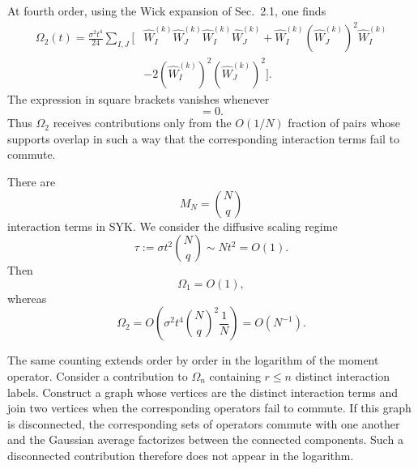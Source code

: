 \documentclass{article}
\theoremstyle{definition}
\begin{document}
At fourth order, using the Wick expansion of Sec.~2.1, one finds
\begin{align}
    \Omega_2(t)
    =
    \frac{\sigma^2t^4}{24}
    \sum_{I,J}
    \bigg[
       &
       \widehat W_I^{(k)}
       \widehat W_J^{(k)}
       \widehat W_I^{(k)}
       \widehat W_J^{(k)}
       +
       \widehat W_I^{(k)}
       \left(\widehat W_J^{(k)}\right)^2
       \widehat W_I^{(k)}
       \nonumber\\
       &
       -
       2
       \left(\widehat W_I^{(k)}\right)^2
       \left(\widehat W_J^{(k)}\right)^2
    \bigg].
    \label{eq:quenched_Omega2}
\end{align}
The expression in square brackets vanishes whenever
\begin{equation}
    [\widehat W_I^{(k)},\widehat W_J^{(k)}]=0.
\end{equation}
Thus $\Omega_2$ receives contributions only from the $O(1/N)$ fraction of
pairs whose supports overlap in such a way that the corresponding
interaction terms fail to commute.

There are
\begin{equation}
    M_N=\binom Nq
\end{equation}
interaction terms in SYK.  We consider the diffusive scaling regime
\begin{equation}
    \tau
    :=
    \sigma t^2\binom Nq
    \sim Nt^2
    =
    O(1).
    \label{eq:quenched_diffusive_tau}
\end{equation}
Then
\begin{equation}
    \Omega_1=O(1),
\end{equation}
whereas
\begin{equation}
    \Omega_2
    =
    O\left(
       \sigma^2t^4
       \binom Nq^2
       \frac1N
    \right)
    =
    O(N^{-1}).
    \label{eq:quenched_Omega2_scaling}
\end{equation}

The same counting extends order by order in the logarithm of the moment
operator.  Consider a contribution to $\Omega_n$ containing $r\leq n$
distinct interaction labels.  Construct a graph whose vertices are the
distinct interaction terms and join two vertices when the corresponding
operators fail to commute.  If this graph is disconnected, the corresponding
sets of operators commute with one another and the Gaussian average
factorizes between the connected components.  Such a disconnected
contribution therefore does not appear in the logarithm.
\end{document}
